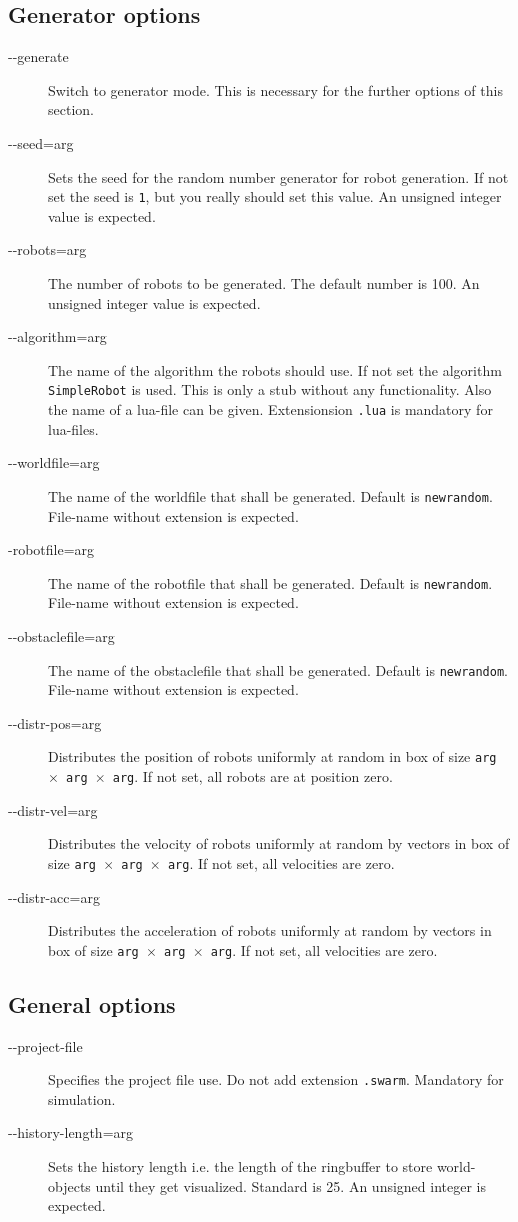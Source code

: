 \documentclass[a4paper,halfparskip,11pt,twoside]{scrartcl}
\begin{document}
\subsection{Generator options}
\begin{description}
	\item [-{}-generate] Switch to generator mode. This is necessary for the further options of this section.
	\item [-{}-seed=arg] Sets the seed for the random number generator for robot generation. If not set the seed is {\tt 1}, but you really should set this value. An unsigned integer value is expected.
	\item [-{}-robots=arg] The number of robots to be generated. The default number is 100. An unsigned integer value is expected.
	\item [-{}-algorithm=arg] The name of the algorithm the robots should use. If not set the algorithm {\tt SimpleRobot} is used. This is only a stub without any functionality. Also the name of a lua-file can be given. Extensionsion {\tt .lua} is mandatory for lua-files.
	\item [-{}-worldfile=arg] The name of the worldfile that shall be generated. Default is {\tt newrandom}. File-name without extension is expected.
	\item [-{}robotfile=arg] The name of the robotfile that shall be generated. Default is {\tt newrandom}. File-name without extension is expected.
	\item [-{}-obstaclefile=arg] The name of the obstaclefile that shall be generated. Default is {\tt newrandom}. File-name without extension is expected.
	\item [-{}-distr-pos=arg] Distributes the position of robots uniformly at random in box of size {\tt arg $\times$ arg $\times$ arg}.
 If not set, all robots are at position zero.
	\item [-{}-distr-vel=arg] Distributes the velocity of robots uniformly at random by vectors in box of size {\tt arg $\times$ arg $\times$ arg}.
 If not set, all velocities are zero.
	\item [-{}-distr-acc=arg] Distributes the acceleration of robots uniformly at random by vectors in box of size {\tt arg $\times$ arg $\times$ arg}.
 If not set, all velocities are zero.
\end{description}

\subsection{General options}
\begin{description}
	\item [-{}-project-file] Specifies the project file use. Do not add extension {\tt .swarm}. Mandatory for simulation.
	\item [-{}-history-length=arg] Sets the history length i.e. the length of the ringbuffer to store world-objects until they get visualized. Standard is 25. An unsigned integer is expected.
\end{description}
\end{document}
